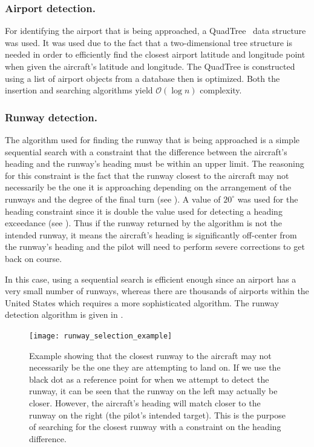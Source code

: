         
        \subsubsection{Airport detection.} \label{sec:detect_airport}
        
        	For identifying the airport that is being approached, a QuadTree~\cite{finkel1974quad} data structure was used.  It was used due to the fact that a two-dimensional tree structure is needed in order to efficiently find the closest airport latitude and longitude point when given the aircraft's latitude and longitude.  The QuadTree is constructed using a list of airport objects from a database then is optimized.  Both the insertion and searching algorithms yield $\mathcal{O}(\log n)$ complexity.


        \subsubsection{Runway detection.}
        
            The algorithm used for finding the runway that is being approached is a simple sequential search with a constraint that the difference between the aircraft's heading and the runway's heading must be within an upper limit.  The reasoning for this constraint is the fact that the runway closest to the aircraft may not necessarily be the one it is approaching depending on the arrangement of the runways and the degree of the final turn (see ).  A value of $20^\circ$ was used for the heading constraint since it is double the value used for detecting a heading exceedance (see ).  Thus if the runway returned by the algorithm is not the intended runway, it means the aircraft's heading is significantly off-center from the runway's heading and the pilot will need to perform severe corrections to get back on course.
            
            In this case, using a sequential search is efficient enough since an airport has a very small number of runways, whereas there are thousands of airports within the United States which requires a more sophisticated algorithm.  The runway detection algorithm is given in .
            
            
            \begin{figure}
            	\centering
				\texttt{[image: runway\_selection\_example]}
				\caption{Example showing that the closest runway to the aircraft may not necessarily be the one they are attempting to land on.  If we use the black dot as a reference point for when we attempt to detect the runway, it can be seen that the runway on the left may actually be closer.  However, the aircraft's heading will match closer to the runway on the right (the pilot's intended target).  This is the purpose of searching for the closest runway with a constraint on the heading difference.}
				\label{fig:runway_selection}
            \end{figure}
            

